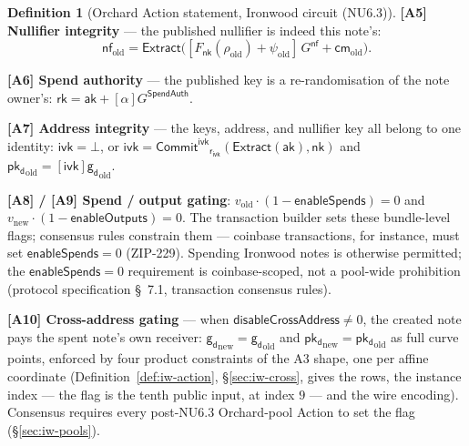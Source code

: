 \documentclass[11pt,a4paper]{article}
\theoremstyle{definition}
\newtheorem{definition}[theorem]{Definition}
\newcommand{\nfsym}{\mathsf{nf}}
\newcommand{\cmsym}{\mathsf{cm}}
\newcommand{\rk}{\mathsf{rk}}
\newcommand{\CommitIvk}{\ensuremath{\mathsf{Commit}^{\mathsf{ivk}}}}
\newcommand{\Extract}{\ensuremath{\mathsf{Extract}}}
\newcommand{\aksym}{\ensuremath{\mathsf{ak}}}
\newcommand{\nksym}{\ensuremath{\mathsf{nk}}}
\newcommand{\ivk}{\ensuremath{\mathsf{ivk}}}
\newcommand{\pkd}{\ensuremath{\mathsf{pk_d}}}
\newcommand{\gd}{\ensuremath{\mathsf{g_d}}}
\newcommand{\rivk}{\ensuremath{\mathsf{r_{ivk}}}}
\begin{document}
\begin{definition}[Orchard Action statement, Ironwood circuit (NU6.3)]
\noindent
\textbf{[A5] Nullifier integrity} --- the published nullifier is indeed this
note's:
\[
\nfsym_{\mathrm{old}} = \Extract\bigl([F_{\nksym}(\rho_{\mathrm{old}}) + \psi_{\mathrm{old}}]\, G^{\mathsf{nf}} + \cmsym_{\mathrm{old}}\bigr).
\]

\noindent
\textbf{[A6] Spend authority} --- the published key is a re-randomisation of
the note owner's: $\rk = \aksym + [\alpha] G^{\mathsf{SpendAuth}}$.

\noindent
\textbf{[A7] Address integrity} --- the keys, address, and nullifier key all
belong to one identity:
$\ivk = \bot$, or
$\ivk = \CommitIvk_{\rivk}(\Extract(\aksym), \nksym)$ and
$\pkd_{\mathrm{old}} = [\ivk] \gd_{\mathrm{old}}$.

\noindent
\textbf{[A8] / [A9] Spend / output gating}:
$v_{\mathrm{old}} \cdot (1 - \mathsf{enableSpends}) = 0$ and
$v_{\mathrm{new}} \cdot (1 - \mathsf{enableOutputs}) = 0$. The transaction
builder sets these bundle-level flags; consensus rules constrain them ---
coinbase transactions, for instance, must set $\mathsf{enableSpends} = 0$
(ZIP-229). Spending Ironwood notes is otherwise permitted; the
$\mathsf{enableSpends} = 0$ requirement is coinbase-scoped, not a
pool-wide prohibition (protocol specification \S~7.1, transaction consensus
rules).

\noindent
\textbf{[A10] Cross-address gating} --- when
$\mathsf{disableCrossAddress} \ne 0$, the created note pays the spent
note's own receiver: $\gd_{\mathrm{new}} = \gd_{\mathrm{old}}$ and
$\pkd_{\mathrm{new}} = \pkd_{\mathrm{old}}$ as full curve points, enforced
by four product constraints of the A3 shape, one per affine coordinate
(Definition~\ref{def:iw-action}, \S\ref{sec:iw-cross}, gives the rows, the
instance index --- the flag is the tenth public input, at index $9$ ---
and the wire encoding). Consensus requires every post-NU6.3 Orchard-pool
Action to set the flag (\S\ref{sec:iw-pools}).
\end{definition}
\end{document}
